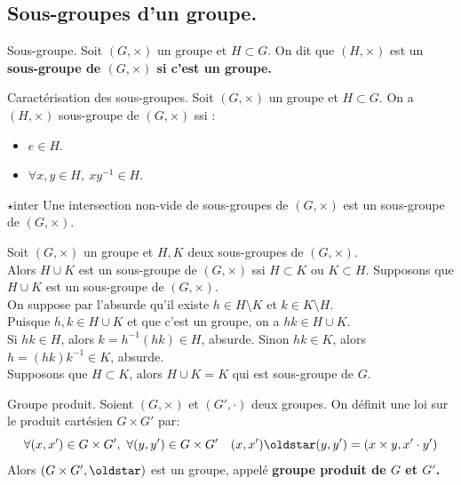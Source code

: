 \documentclass[11pt]{article}
\begin{document}
\subsection{Sous-groupes d'un groupe.}

\begin{defi}{Sous-groupe.}{}
    Soit $(G,\times)$ un groupe et $H\subset G$. On dit que $(H,\times)$ est un \bf{sous-groupe} de $(G,\times)$ si c'est un groupe.
\end{defi}

\begin{prop}{Caractérisation des sous-groupes.}{}
    Soit $(G,\times)$ un groupe et $H\subset G$. On a $(H,\times)$ sous-groupe de $(G,\times)$ ssi :
    \begin{itemize}
        \item $e\in H$.
        \item $\forall x,y \in H, ~ xy^{-1}\in H$.
    \end{itemize}
\end{prop}

\begin{prop}{$\star$}{inter}
    Une intersection non-vide de sous-groupes de $(G,\times)$ est un sous-groupe de $(G,\times)$.
\end{prop}

\begin{prop}{}{}
    Soit $(G,\times)$ un groupe et $H,K$ deux sous-groupes de $(G,\times)$.\\
    Alors $H\cup K$ est un sous-groupe de $(G,\times)$ ssi $H\subset K$ ou $K\subset H$.
    \tcblower
    \boxed{\ra} Supposons que $H\cup K$ est un sous-groupe de $(G,\times)$.\\
    On suppose par l'absurde qu'il existe $h\in H\setminus K$ et $k\in K\setminus H$.\\
    Puisque $h,k\in H\cup K$ et que c'est un groupe, on a $hk\in H\cup K$.\\
    Si $hk\in H$, alors $k=h^{-1}(hk)\in H$, absurde. Sinon $hk\in K$, alors $h=(hk)k^{-1}\in K$, absurde.\\
    \boxed{\la} Supposons que $H\subset K$, alors $H\cup K=K$ qui est sous-groupe de $G$. 
\end{prop}

\begin{defi}{Groupe produit.}{}
    Soient $(G,\times)$ et $(G',\cdot)$ deux groupes. On définit une loi sur le produit cartésien $G\times G'$ par:
    \begin{equation*}
        \forall (x,x')\in G\times G', ~ \forall (y,y')\in G\times G' \quad (x,x')\oldstar(y,y')=(x\times y,x'\cdot y')
    \end{equation*}
    Alors $(G\times G', \oldstar)$ est un groupe, appelé \bf{groupe produit} de $G$ et $G'$.
\end{defi}
\end{document}
